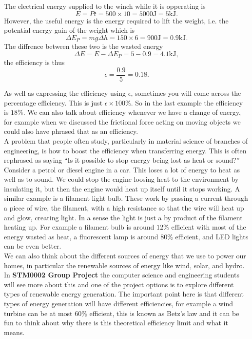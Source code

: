 The electrical energy supplied to the winch while it is opperating is
\begin{equation*}
E=Pt=500\times 10=5000\text{J} = 5\text{kJ}.
\end{equation*}
However, the useful energy is the energy required to lift the weight, i.e. the potential energy gain of the weight which is
\begin{equation*}
\Delta E_{P}=mg \Delta h=150\times 6=900\text{J}=0.9\text{kJ}.
\end{equation*}
The diffrence between these two is the wasted energy
\begin{equation*}
\Delta E= E-\Delta E_{P}=5-0.9=4.1\text{kJ},
\end{equation*}
the efficiency is thus 
\begin{equation*}
\epsilon =\frac{0.9}{5}=0.18.
\end{equation*}

As well as expressing the efficiency using $\epsilon$, sometimes you will come across the percentage efficiency. This is just $\epsilon\times 100\%$. So in the last example the efficiency is $18\%$. We can also talk about efficiency whenever we have a change of energy, for example when we discussed the frictional force acting on moving objects we could also have phrased that as an efficiency. \\

A problem that people often study, particularly in material science of branches of engineering, is how to boost the efficiency when transferring energy. This is often rephrased as saying ``Is it possible to stop energy being lost as heat or sound?''\\

Consider a petrol or diesel engine in a car. This loses a lot of energy to heat as well as to sound. We could stop the engine loosing heat to the environment by insulating it, but then the engine would heat up itself until it stops working.  A similar example is a filament light bulb. These work by passing a current through a piece of wire, the filament, with a high resistance so that the wire will heat up and glow, creating light. In a sense the light is just a by product of the filament heating up. For example a filament bulb is around $12\%$ efficient with most of the energy wasted as heat, a fluorescent lamp is around $80\%$ efficient, and LED lights can be even better.\\

We can also think about the different sources of energy that we use to power our homes, in particular the renewable sources of energy like wind, solar, and hydro. In \textbf{STM0002 Group Project} the computer science and engineering students will see more about this and one of the project options is to explore different types of renewable energy generation. The important point here is that different types of energy generation will have different efficiencies, for example a wind turbine can be at most $60\%$ efficient, this is known as Betz's law and it can be fun to think about why there is this theoretical efficiency limit and what it means.\\

